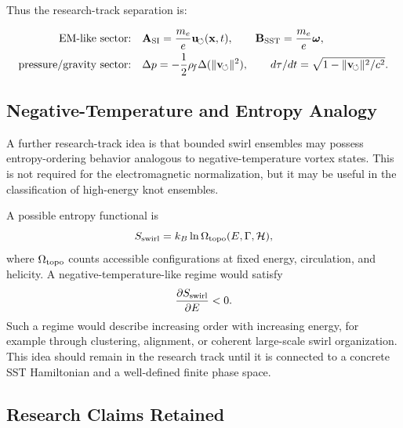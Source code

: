     Thus the research-track separation is:
    
    \begin{align}
        \text{EM-like sector:}
        \quad
        &\mathbf{A}_{\rm SI}
        =
        \frac{m_e}{e}\mathbf{u}_{\!\boldsymbol{\circlearrowleft}}(\mathbf{x},t),
        \qquad
        \mathbf{B}_{\rm SST}
        =
        \frac{m_e}{e}\boldsymbol{\omega},
        \label{eq:em_sector_summary}
        \\
        \text{pressure/gravity sector:}
        \quad
        &\Delta p
        =
        -
        \frac{1}{2}\rho_{\!f}
        \Delta(\lVert\mathbf{v}_{\!\boldsymbol{\circlearrowleft}}\rVert^2),
        \qquad
        d\tau/dt
        =
        \sqrt{1-\lVert\mathbf{v}_{\!\boldsymbol{\circlearrowleft}}\rVert^2/c^2}.
        \label{eq:pressure_gravity_sector_summary}
    \end{align}

\subsection{Negative-Temperature and Entropy Analogy}
    
    A further research-track idea is that bounded swirl ensembles may possess
    entropy-ordering behavior analogous to negative-temperature vortex states.
    This is not required for the electromagnetic normalization, but it may be
    useful in the classification of high-energy knot ensembles.
    
    A possible entropy functional is
    \begin{equation}
        S_{\rm swirl}
        =
        k_B\ln\Omega_{\rm topo}(E,\Gamma,\mathcal{H}),
        \label{eq:swirl_entropy}
    \end{equation}
    where \(\Omega_{\rm topo}\) counts accessible configurations at fixed
    energy, circulation, and helicity.  A negative-temperature-like regime
    would satisfy
    \begin{equation}
        \frac{\partial S_{\rm swirl}}{\partial E}
        <
        0.
        \label{eq:negative_temperature_condition}
    \end{equation}
    Such a regime would describe increasing order with increasing energy,
    for example through clustering, alignment, or coherent large-scale swirl
    organization.  This idea should remain in the research track until it is
    connected to a concrete SST Hamiltonian and a well-defined finite phase
    space.

\subsection{Research Claims Retained}
    
